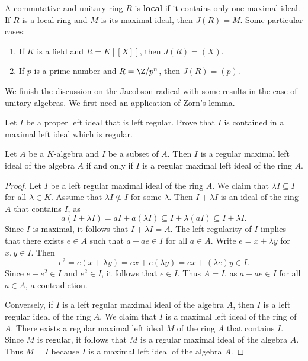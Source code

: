 \begin{example}
    A commutative and unitary ring $R$ is \textbf{local} if it contains
    only one maximal ideal. 
	If $R$ is a local ring and $M$ is its maximal ideal, then $J(R)=M$. Some particular cases: 
	\begin{enumerate}
		\item If $K$ is a field and $R=K[\![X]\!]$, then $J(R)=(X)$. 
		\item If $p$ is a prime number and $R=\Z/p^n$, then $J(R)=(p)$. 
	\end{enumerate}
\end{example}

We finish the discussion on the Jacobson radical with 
some results in the case of unitary algebras. We first need an application of Zorn's lemma. 

\begin{exercise}
\label{xca:maximal_regular}
    Let $I$ be a proper left ideal that is left regular. Prove that $I$ is contained in a maximal left ideal 
    which is regular. 
\end{exercise}

\begin{proposition}
	Let $A$ be a $K$-algebra and $I$ be a subset of $A$. Then $I$ is 
	a regular maximal left ideal of the algebra $A$ if and only if $I$ is 
	a regular maximal left ideal of the ring $A$.
\end{proposition}

\begin{proof}
	Let $I$ be a left regular maximal ideal of the ring $A$. We claim that
	$\lambda I\subseteq I$ for all $\lambda\in K$. Assume that 
	$\lambda I\not\subseteq I$ for some $\lambda$. Then $I+\lambda I$
	is an ideal of the ring $A$ that contains $I$, as 
	\[
	a(I+\lambda I)=aI+a(\lambda I)\subseteq I+\lambda (aI)\subseteq I+\lambda I.
	\]
	Since $I$ is maximal, it follows that $I+\lambda I=A$. 
	The left regularity of $I$ implies that there exists $e\in A$
	such that 
	$a-ae\in I$ for all $a\in A$. Write $e=x+\lambda y$ for $x,y\in
	I$. Then 
	\[
		e^2=e(x+\lambda y)=ex+e(\lambda y)=ex+(\lambda e)y\in I.
	\]
	Since $e-e^2\in I$ and $e^2\in I$, it follows that $e\in I$. Thus $A=I$, as
	$a-ae\in I$ for all $a\in A$, a contradiction.

	Conversely, if $I$ is a left regular maximal ideal of the algebra $A$, then 
	$I$ is a left regular ideal of the ring $A$. We claim that $I$ is a maximal left ideal of the ring of $A$. 
	There exists a regular maximal left ideal $M$ 
	of the ring $A$ that contains $I$. Since 
	$M$ is regular, it follows that $M$ is a regular maximal ideal of the algebra $A$. Thus 
	$M=I$ because $I$ is a maximal left ideal of the algebra $A$. 
\end{proof}

